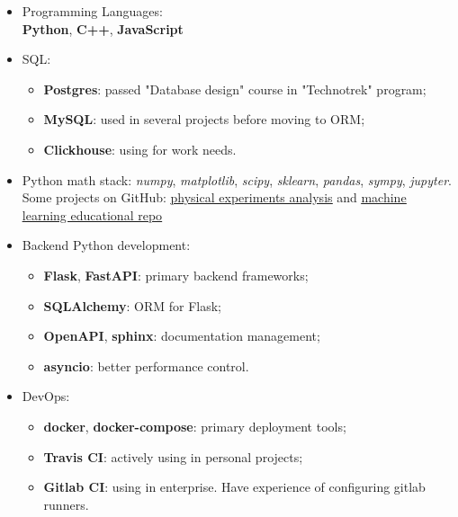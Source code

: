 \begin{itemize}
	\item Programming Languages: \\ 
        \textbf{Python}, \textbf{C++}, \textbf{JavaScript}
    \item SQL: 
        \begin{itemize}
            \item \textbf{Postgres}: passed "Database design" course in "Technotrek" program;
            \item \textbf{MySQL}: used in several projects before moving to ORM;
            \item \textbf{Clickhouse}: using for work needs.
        \end{itemize}
    \item Python math stack: \textit{numpy}, \textit{matplotlib}, \textit{scipy}, \textit{sklearn}, \textit{pandas}, \textit{sympy}, \textit{jupyter}. 
    Some projects on GitHub: \href{https://github.com/alekseik1/phys\_labs}{\underline{physical experiments analysis}} and \href{https://github.com/alekseik1/machine\_learning\_coursera}{\underline{machine learning educational repo}}
    \item Backend Python development: 
        \begin{itemize}
            \item \textbf{Flask}, \textbf{FastAPI}: primary backend frameworks;
            \item \textbf{SQLAlchemy}: ORM for Flask;
            \item \textbf{OpenAPI}, \textbf{sphinx}: documentation management;
            \item \textbf{asyncio}: better performance control.
        \end{itemize}
    \item DevOps: 
        \begin{itemize}
            \item \textbf{docker}, \textbf{docker-compose}: primary deployment tools;
            \item \textbf{Travis CI}: actively using in personal projects;
            \item \textbf{Gitlab CI}: using in enterprise.
                Have experience of configuring gitlab runners.
        \end{itemize}
\end{itemize}

